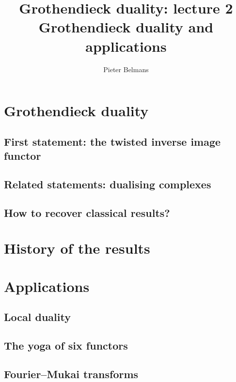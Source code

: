 \documentclass[10pt,a4paper]{article}
\title{Grothendieck duality: lecture 2 \\[.2em] \Large Grothendieck duality and applications}
\author{Pieter Belmans}
\begin{document}
\maketitle

\begin{abstract}
  
\end{abstract}

\tableofcontents

\section{Grothendieck duality}
\label{section:grothendieck-duality}
\subsection{First statement: the twisted inverse image functor}
\label{subsection:first-statement}

\subsection{Related statements: dualising complexes}
\label{subsection:related-statements}

\subsection{How to recover classical results?}
\label{subsection:classical-results}


\section{History of the results}
\label{section:history}


\section{Applications}
\label{section:applications}
\subsection{Local duality}
\label{subsection:local-duality}

\subsection{The yoga of six functors}
\label{subsection:six-functors-yoga}

\subsection{Fourier--Mukai transforms}
\label{subsection:fourier-mukai-transforms}




\printbibliography
\end{document}
